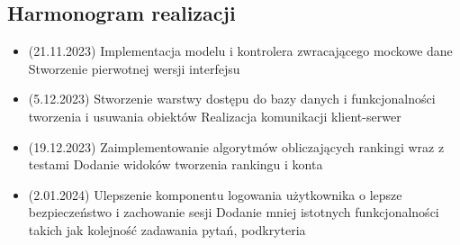 \documentclass{article}
\begin{document}
\pagebreak
\subsection{Harmonogram realizacji}
\begin{itemize}
    \item (21.11.2023)
    \subitem Implementacja modelu i kontrolera zwracającego mockowe dane 
    \subitem Stworzenie pierwotnej wersji interfejsu
    \item (5.12.2023)
    \subitem Stworzenie warstwy dostępu do bazy danych i funkcjonalności tworzenia i usuwania obiektów 
    \subitem Realizacja komunikacji klient-serwer
    \item (19.12.2023) 
    \subitem Zaimplementowanie algorytmów obliczających rankingi wraz z testami 
    \subitem Dodanie widoków tworzenia rankingu i konta
    \item (2.01.2024) 
    \subitem Ulepszenie komponentu logowania użytkownika o lepsze bezpieczeństwo i zachowanie sesji 
    \subitem Dodanie mniej istotnych funkcjonalności takich jak kolejność zadawania pytań, podkryteria
\end{itemize}
\end{document}
